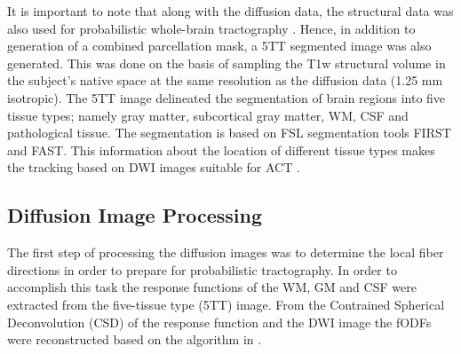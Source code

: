 \documentclass[msthesis.tex]{subfiles}
\begin{document}
It is important to note that along with the diffusion data, the structural data was also used for probabilistic whole-brain tractography \citep{parker2003framework}. Hence, in addition to generation of a combined parcellation mask, a \gls{5TT} segmented image was also generated. This was done on the basis of sampling the T1w structural volume in the subject's native space at the same resolution as the diffusion data (1.25 mm isotropic). The 5TT image delineated the segmentation of brain regions into five tissue types; namely gray matter, subcortical gray matter, \gls{WM}, \gls{CSF} and pathological tissue. The segmentation is based on FSL segmentation tools FIRST and FAST. This information about the location of different tissue types makes the tracking based on DWI images suitable for \gls{ACT} \citep{anattractsmith}.

\subsection{Diffusion Image Processing}
\label{sec:Diffusionimgprepro}

The first step of processing the diffusion images was to determine the local fiber directions in order to prepare for probabilistic tractography. In order to accomplish this task the response functions of the \gls{WM}, \gls{GM} and \gls{CSF} were extracted from the five-tissue type (5TT) image. From the Contrained Spherical Deconvolution (CSD) of the response function and the DWI image the \gls{fODF}s were reconstructed based on  the algorithm in \cite{jeurissen2014multi}. 
\end{document}
